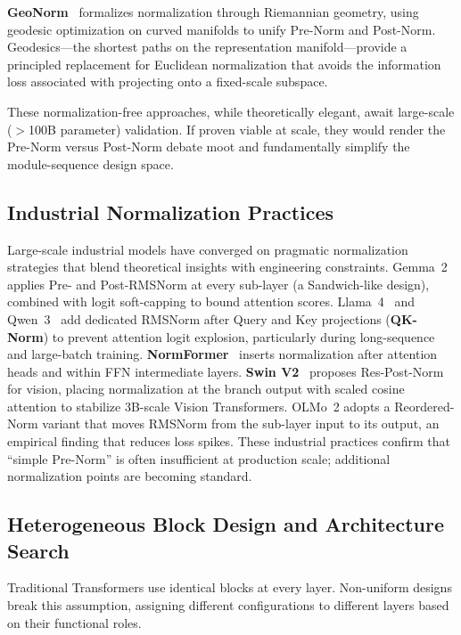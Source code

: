 \textbf{GeoNorm}~\cite{geonorm2026} formalizes normalization through Riemannian geometry, using geodesic optimization on curved manifolds to unify Pre-Norm and Post-Norm. Geodesics---the shortest paths on the representation manifold---provide a principled replacement for Euclidean normalization that avoids the information loss associated with projecting onto a fixed-scale subspace.

These normalization-free approaches, while theoretically elegant, await large-scale ($>$100B parameter) validation. If proven viable at scale, they would render the Pre-Norm versus Post-Norm debate moot and fundamentally simplify the module-sequence design space.

\subsection{Industrial Normalization Practices}
\label{subsec:industrial_norm}

Large-scale industrial models have converged on pragmatic normalization strategies that blend theoretical insights with engineering constraints. Gemma~2~\cite{gemma2024improving} applies Pre- and Post-RMSNorm at every sub-layer (a Sandwich-like design), combined with logit soft-capping to bound attention scores. Llama~4~\cite{llama4_2025} and Qwen~3~\cite{yang2025qwen3} add dedicated RMSNorm after Query and Key projections (\textbf{QK-Norm}) to prevent attention logit explosion, particularly during long-sequence and large-batch training. \textbf{NormFormer}~\cite{shleifer2022normformer} inserts normalization after attention heads and within FFN intermediate layers. \textbf{Swin V2}~\cite{liu2022swinv2} proposes Res-Post-Norm for vision, placing normalization at the branch output with scaled cosine attention to stabilize 3B-scale Vision Transformers. OLMo~2 adopts a Reordered-Norm variant that moves RMSNorm from the sub-layer input to its output, an empirical finding that reduces loss spikes. These industrial practices confirm that ``simple Pre-Norm'' is often insufficient at production scale; additional normalization points are becoming standard.

\subsection{Heterogeneous Block Design and Architecture Search}
\label{subsec:hetero_blocks}

Traditional Transformers use identical blocks at every layer. Non-uniform designs break this assumption, assigning different configurations to different layers based on their functional roles.

